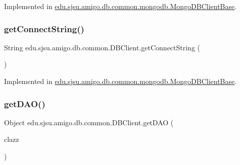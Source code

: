 Implemented in \hyperlink{classedu_1_1sjsu_1_1amigo_1_1db_1_1common_1_1mongodb_1_1_mongo_d_b_client_base_a1958dd7d55b132f55c54547e70ddb52f}{edu.\+sjsu.\+amigo.\+db.\+common.\+mongodb.\+Mongo\+D\+B\+Client\+Base}.

\mbox{\label{interfaceedu_1_1sjsu_1_1amigo_1_1db_1_1common_1_1_d_b_client_ad69072c1ef72bd58d7f6ce71050c4c8f}} 
\subsubsection{\texorpdfstring{get\+Connect\+String()}{getConnectString()}}
{\footnotesize\ttfamily String edu.\+sjsu.\+amigo.\+db.\+common.\+D\+B\+Client.\+get\+Connect\+String (\begin{DoxyParamCaption}{ }\end{DoxyParamCaption})}



Implemented in \hyperlink{classedu_1_1sjsu_1_1amigo_1_1db_1_1common_1_1mongodb_1_1_mongo_d_b_client_base_af5de39557a28690a32d078484a8938f7}{edu.\+sjsu.\+amigo.\+db.\+common.\+mongodb.\+Mongo\+D\+B\+Client\+Base}.

\mbox{\label{interfaceedu_1_1sjsu_1_1amigo_1_1db_1_1common_1_1_d_b_client_a82ddc58c08fa294ceb762b9443937964}} 
\subsubsection{\texorpdfstring{get\+D\+A\+O()}{getDAO()}}
{\footnotesize\ttfamily Object edu.\+sjsu.\+amigo.\+db.\+common.\+D\+B\+Client.\+get\+D\+AO (\begin{DoxyParamCaption}\item[{Class$<$? extends \hyperlink{interfaceedu_1_1sjsu_1_1amigo_1_1db_1_1common_1_1_base_d_a_o}{Base\+D\+AO} $>$}]{clazz }\end{DoxyParamCaption})}



